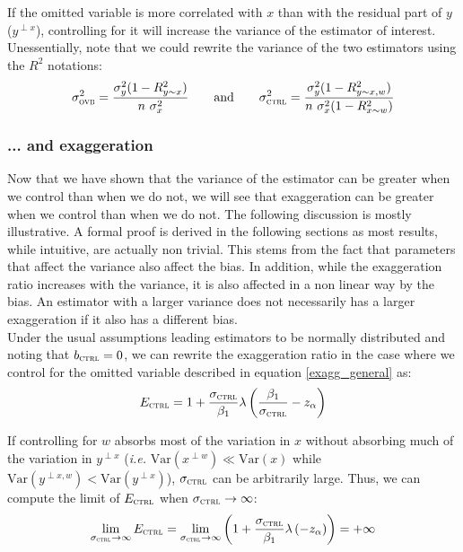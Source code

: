 \documentclass[a4paper, 11pt]{report}
\begin{document}
			If the omitted variable is more correlated with $x$ than with the residual part of $y$ ($y^{\perp x}$), controlling for it will increase the variance of the estimator of interest.\\
			
			Unessentially, note that we could rewrite the variance of the two estimators using the $R^{2}$ notations:
			~
			\[
				\sigma_{\textsc{ovb}}^2 = \dfrac{\sigma^{2}_{y}(1 - R^{2}_{y \sim x})}{n \ \sigma^{2}_{x}} \qquad \text{and} \qquad \sigma_{\textsc{ctrl}}^2 = \dfrac{\sigma^{2}_{y}(1 - R^{2}_{y \sim x, w})}{n \ \sigma^{2}_{x} (1 - R^{2}_{x \sim w}) }
			\]
			
			\subsubsection{... and exaggeration}
			
			Now that we have shown that the variance of the estimator can be greater when we control than when we do not, we will see that exaggeration can be greater when we control than when we do not. The following discussion is mostly illustrative. A formal proof is derived in the following sections as most results, while intuitive, are actually non trivial. This stems from the fact that parameters that affect the variance also affect the bias. In addition, while the exaggeration ratio increases with the variance, it is also affected in a non linear way by the bias. An estimator with a larger variance does not necessarily has a larger exaggeration if it also has a different bias.\\
						
			Under the usual assumptions leading estimators to be normally distributed and noting that $b_{\textsc{ctrl}} = 0$, we can rewrite the exaggeration ratio in the case where we control for the omitted variable described in equation \ref{exagg_general} as:
			~
			\[
				E_{\textsc{ctrl}}  = 1 + \dfrac{\sigma_{\textsc{ctrl}}}{\beta_{1}}\lambda\left( \dfrac{\beta_{1}}{\sigma_{\textsc{ctrl}}} - z_{\alpha} \right) 
			\]
			
			If controlling for $w$ absorbs most of the variation in $x$ without absorbing much of the variation in $y^{\perp x}$ (\textit{i.e.} $\text{Var}(x^{\perp w}) \ll \text{Var}(x)$ while  $\text{Var}(y^{\perp x, w}) < \text{Var}(y^{\perp x})$), $\sigma_{\textsc{ctrl}}$ can be arbitrarily large. Thus, we can compute the limit of $E_{\textsc{ctrl}}$ when $\sigma_{\textsc{ctrl}} \to \infty$:
			~
			\[
				\lim_{\sigma_{\textsc{ctrl}} \to \infty} E_{\textsc{ctrl}} = \lim_{\sigma_{\textsc{ctrl}} \to \infty} \left( 1 + \dfrac{\sigma_{\textsc{ctrl}}}{\beta_{1}}\lambda\left(- z_{\alpha} \right) \right) = + \infty
			\]
			 
\end{document}
